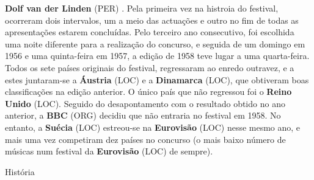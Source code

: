 \documentclass[12pt,a4paper]{article}
\begin{document}
\textbf{Dolf van der Linden} (PER) . Pela primeira vez na histroia do festival, ocorreram dois intervalos, um a meio das actuações e outro no fim de todas as apresentações estarem concluídas. Pelo terceiro ano consecutivo, foi escolhida uma noite diferente para a realização do concurso, e seguida de um domingo em 1956 e uma quinta-feira em 1957, a edição de 1958 teve lugar a uma quarta-feira. Todos os sete países originais do festival, regressaram ao enredo outravez, e a estes juntaram-se a \textbf{Áustria} (LOC) e a \textbf{Dinamarca} (LOC), que obtiveram boas classificações na edição anterior. O único país que não regressou foi o \textbf{Reino Unido} (LOC). Seguido do desapontamento com o resultado obtido no ano anterior, a \textbf{BBC} (ORG) decidiu que não entraria no festival em 1958. No entanto, a \textbf{Suécia} (LOC) estreou-se na \textbf{Eurovisão} (LOC) nesse mesmo ano, e mais uma vez competiram dez países no concurso (o mais baixo número de músicas num festival da \textbf{Eurovisão} (LOC) de sempre).



História
\end{document}
